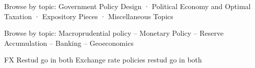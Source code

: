 
Browse by topic: Government Policy Design · Political Economy and Optimal Taxation · Expository Pieces · Miscellaneous Topics


Browse by topic:  Macroprudential policy  -- Monetary Policy -- Reserve Accumulation -- Banking --  Geoeconomics

FX Restud go in both
Exchange rate policies restud go in both


